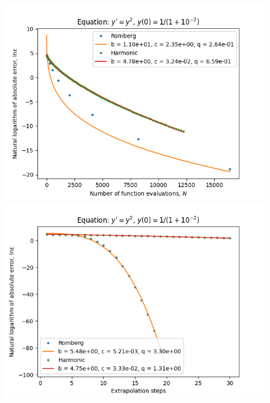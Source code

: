 \begin{figure}[H]
\centering
\begin{minipage}{0.45\textwidth}
\centering
\includegraphics[scale=0.45]{../results/emr_plots/singularity_2_hp_trend.png}
\end{minipage}
\begin{minipage}{0.45\textwidth}
\centering
\includegraphics[scale=0.45]{../results/emr_plots/singularity_2_hp_steps.png}
\end{minipage}
\end{figure}

